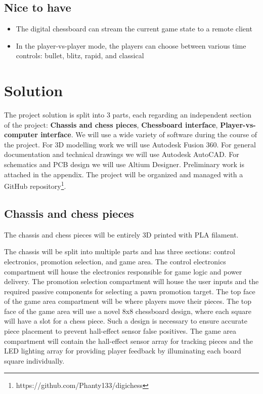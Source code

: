 \documentclass{article}
\begin{document}
\subsection*{Nice to have}
\begin{itemize}
	\item The digital chessboard can stream the current game state to a remote client
	\item In the player-vs-player mode, the players can choose between various time controls: bullet, blitz, rapid, and classical
\end{itemize}

\section{Solution}

The project solution is split into 3 parts, each regarding an independent section of the project: \textbf{Chassis and chess pieces}, \textbf{Chessboard interface}, \textbf{Player-vs-computer interface}. We will use a wide variety of software during the course of the project. For 3D modelling work we will use Autodesk Fusion 360. For general documentation and technical drawings we will use Autodesk AutoCAD. For schematics and PCB design we will use Altium Designer. Preliminary work is attached in the appendix. The project will be organized and managed with a GitHub repository\footnote{https://github.com/Phanty133/digichess}.

\subsection*{Chassis and chess pieces}

The chassis and chess pieces will be entirely 3D printed with PLA filament.

The chassis will be split into multiple parts and has three sections: control electronics, promotion selection, and game area. The control electronics compartment will house the electronics responsible for game logic and power delivery. The promotion selection compartment will house the user inputs and the required passive components for selecting a pawn promotion target. The top face of the game area compartment will be where players move their pieces. The top face of the game area will use a novel 8x8 chessboard design, where each square will have a slot for a chess piece. Such a design is necessary to ensure accurate piece placement to prevent hall-effect sensor false positives. The game area compartment will contain the hall-effect sensor array for tracking pieces and the LED lighting array for providing player feedback by illuminating each board square individually.
\end{document}
